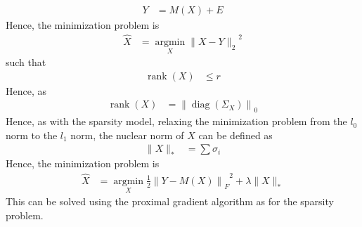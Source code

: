 \documentclass[titlepage, fleqn, a4paper, 12pt, twoside]{article}
\theoremstyle{definition}
\theoremstyle{theorem}
\DeclareMathOperator{\argmin}{\mathrm{argmin}}
\DeclareMathOperator{\rank}{\mathrm{rank}}
\DeclareMathOperator{\diag}{\mathrm{diag}}
\begin{document}
\begin{align*}
	Y &= M(X) + E
\end{align*}
Hence, the minimization problem is
\begin{align*}
	\hat{X} &= \argmin\limits_{X} {\|X - Y\|_2}^2
\end{align*}
such that
\begin{align*}
	\rank(X) &\le r
\end{align*}
Hence, as
\begin{align*}
	\rank(X) &= \left\| \diag(\Sigma_X) \right\|_0
\end{align*}
Hence, as with the sparsity model, relaxing the minimization problem from the $l_0$ norm to the $l_1$ norm, the nuclear norm of $X$ can be defined as
\begin{align*}
	\|X\|_* &= \sum \sigma_i
\end{align*}
Hence, the minimization problem is
\begin{align*}
	\hat{X} &= {\argmin\limits_{X} \frac{1}{2} \left\| Y - M(X) \right\|_F}^2 + \lambda \|X\|_*
\end{align*}
This can be solved using the proximal gradient algorithm as for the sparsity problem.

\clearpage
\printindex
\end{document}
